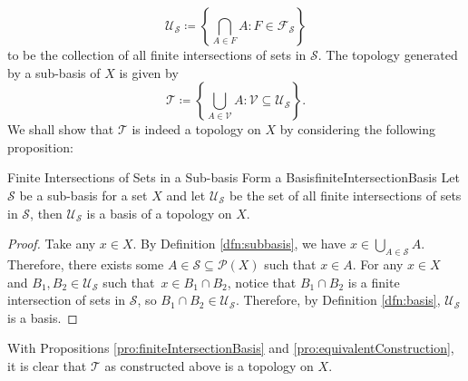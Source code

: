 \documentclass[math]{amznotes}
\theoremstyle{remark}
\begin{document}
\begin{equation*}
    \mathcal{U}_{\mathcal{S}} \coloneqq \left\{\bigcap_{A \in F}A \colon F \in \mathcal{F}_{\mathcal{S}}\right\}
\end{equation*}
to be the collection of all finite intersections of sets in $\mathcal{S}$. The topology generated by a sub-basis of $X$ is given by 
\begin{equation*}
    \mathcal{T} \coloneqq \left\{\bigcup_{A \in \mathcal{V}}A  \colon \mathcal{V}\subseteq \mathcal{U}_{\mathcal{S}}\right\}.
\end{equation*}
We shall show that $\mathcal{T}$ is indeed a topology on $X$ by considering the following proposition:
\begin{probox}{Finite Intersections of Sets in a Sub-basis Form a Basis}{finiteIntersectionBasis}
    Let $\mathcal{S}$ be a sub-basis for a set $X$ and let $\mathcal{U}_{\mathcal{S}}$ be the set of all finite intersections of sets in $\mathcal{S}$, then $\mathcal{U}_{\mathcal{S}}$ is a basis of a topology on $X$.
    \tcblower
    \begin{proof}
        Take any $x \in X$. By Definition \ref{dfn:subbasis}, we have $x \in \bigcup_{A \in \mathcal{S}}A$. Therefore, there exists some $A \in \mathcal{S} \subseteq \mathcal{P}\left(X\right)$ such that $x \in A$. For any $x \in X$ and $B_1, B_2 \in \mathcal{U}_{\mathcal{S}}$ such that~$x \in B_1 \cap B_2$, notice that $B_1 \cap B_2$ is a finite intersection of sets in $\mathcal{S}$, so $B_1 \cap B_2 \in \mathcal{U}_{\mathcal{S}}$. Therefore, by Definition \ref{dfn:basis}, $\mathcal{U}_{\mathcal{S}}$ is a basis. 
    \end{proof}
\end{probox}
With Propositions \ref{pro:finiteIntersectionBasis} and \ref{pro:equivalentConstruction}, it is clear that $\mathcal{T}$ as constructed above is a topology on $X$.
\end{document}
